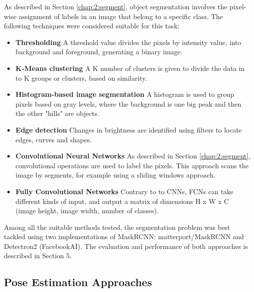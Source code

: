 As described in Section \ref{chap:2:segment}, object segmentation involves the pixel-wise assignment of labels in an image that belong to a specific class. The following techniques were considered suitable for this task:
\begin{itemize}
    \item \textbf{Thresholding} A threshold value divides the pixels by intensity value, into background and foreground, generating a binary image.
    \item \textbf{K-Means clustering} A K number of clusters is given to divide the data in to K groups or clusters, based on similarity.
    \item \textbf{Histogram-based image segmentation} A histogram is used to group pixels based on gray levels, where the background is one big peak and then the other "hills" are objects.
    \item \textbf{Edge detection} Changes in brightness are identified using filters to locate edges, curves and shapes. 
    \item \textbf{Convolutional Neural Networks} As described in Section \ref{chap:2:segment}, convolutional operations are used to label the pixels. This approach scans the image by segments, for example using a sliding windows approach.
    \item \textbf{Fully Convolutional Networks} Contrary to to CNNs, FCNs can take different kinds of input, and output a matrix of dimensions H x W x C (image height, image width, number of classes).  
\end{itemize}
Among all the suitable methods tested, the segmentation problem was best tackled using two implementations of MaskRCNN: matterport/MaskRCNN and Detectron2 (FacebookAI). The evaluation and performance of both approaches is described in Section 5.


\subsection{Pose Estimation Approaches}


